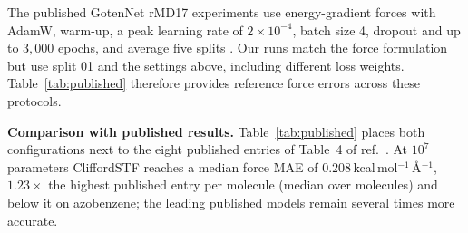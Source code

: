 The published GotenNet rMD17 experiments use energy-gradient forces with AdamW, warm-up, a peak learning rate of $2\times10^{-4}$, batch size 4, dropout and up to $3{,}000$ epochs, and average five splits \cite{aykent2025gotennet}. Our runs match the force formulation but use split 01 and the settings above, including different loss weights. Table~\ref{tab:published} therefore provides reference force errors across these protocols.

\textbf{Comparison with published results.} Table~\ref{tab:published} places both configurations next to the eight published entries of Table~4 of ref.~. At $10^{7}$ parameters CliffordSTF reaches a median force MAE of $0.208$\,kcal\,mol$^{-1}$\,\AA$^{-1}$, $1.23\times$ the highest published entry per molecule (median over molecules) and below it on azobenzene; the leading published models remain several times more accurate.

